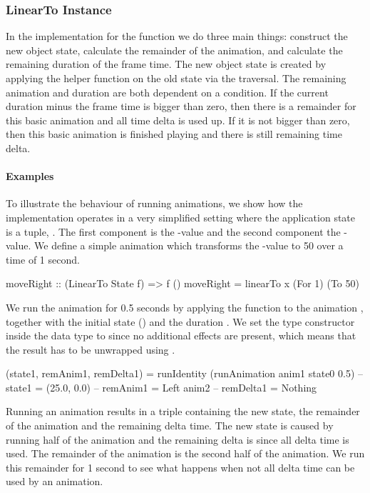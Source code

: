 \subsubsection{LinearTo Instance}

In the implementation for the  function we do three main things: construct the new object state, calculate the remainder of the animation, and calculate the remaining duration of the frame time. The new object state is created by applying the helper function  on the old state via the traversal. The remaining animation and duration are both dependent on a condition. If the current duration minus the frame time is bigger than zero, then there is a remainder for this basic animation and all time delta is used up. If it is not bigger than zero, then this basic animation is finished playing and there is still remaining time delta.

\paragraph{Examples}

To illustrate the behaviour of running animations, we show how the implementation operates in a very simplified setting where the application state is a tuple, . The first component is the -value and the second component the -value. We define a simple animation  which transforms the -value to 50 over a time of 1 second.

\begin{code}
moveRight :: (LinearTo State f) => f ()
moveRight = linearTo x (For 1) (To 50)
\end{code}

We run the animation for 0.5 seconds by applying the  function to the animation , together with the initial state () and the duration . We set the type constructor  inside the  data type to  since no additional effects are present, which means that the result has to be unwrapped using .

\begin{code}
(state1, remAnim1, remDelta1) =
  runIdentity (runAnimation anim1 state0 0.5)
-- state1 = (25.0, 0.0)
-- remAnim1 = Left anim2
-- remDelta1 = Nothing
\end{code}

Running an animation results in a triple containing the new state, the remainder of the animation and the remaining delta time. The new state is  caused by running half of the  animation and the remaining delta is  since all delta time is used. The remainder of the animation is the second half of the  animation. We run this remainder for 1 second to see what happens when not all delta time can be used by an animation.

